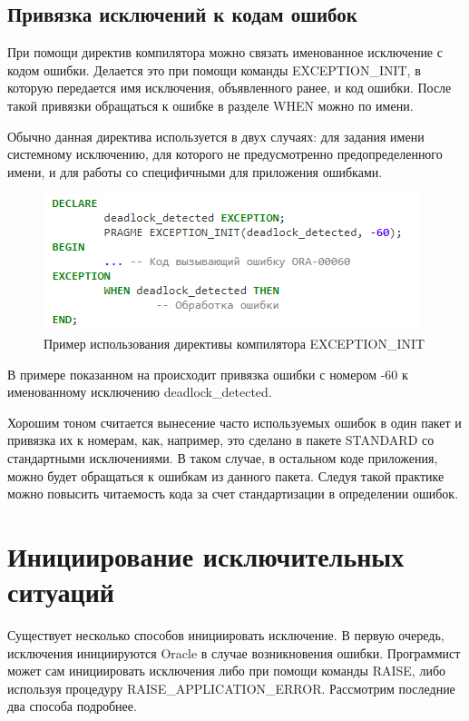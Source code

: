 \subsection{Привязка исключений к кодам ошибок}

При помощи директив компилятора можно связать именованное исключение с кодом ошибки. Делается это при помощи команды EXCEPTION\_INIT, в которую передается имя исключения, объявленного ранее, и код ошибки. После такой привязки обращаться к ошибке в разделе WHEN можно по имени. 

Обычно данная директива используется в двух случаях: для задания имени системному исключению, для которого не предусмотренно предопределенного имени, и для работы со специфичными для приложения ошибками.

\begin{figure}[ht!] 
	\center
	\includegraphics [scale=1] {my_folder/img/C1_exception_init}
	\caption{Пример использования директивы компилятора EXCEPTION\_INIT} 
	\label{fig:C1_exeception_init}  
\end{figure}
\FloatBarrier

В примере показанном на  происходит привязка ошибки с номером -60 к именованному исключению deadlock\_detected.

Хорошим тоном считается вынесение часто используемых ошибок в один пакет и привязка их к номерам, как, например, это сделано в пакете STANDARD со стандартными исключениями. В таком случае, в остальном коде приложения, можно будет обращаться к ошибкам из данного пакета. Следуя такой практике можно повысить читаемость кода за счет стандартизации в определении ошибок.

\section{Инициирование исключительных ситуаций}\label{ch1:sec3}

Существует несколько способов инициировать исключение. В первую очередь, исключения инициируются Oracle в случае возникновения ошибки. Программист может сам инициировать исключения либо при помощи команды RAISE, либо используя процедуру RAISE\_APPLICATION\_ERROR. Рассмотрим последние два способа подробнее.
 
